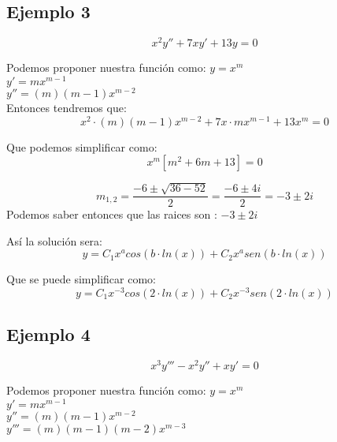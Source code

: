 \documentclass[12pt]{report}                               %
\begin{document}
        \subsection{Ejemplo 3}
        \begin{equation*}
            x^2 y'' + 7 x y' + 13y = 0
        \end{equation*}

        Podemos proponer nuestra función como:
        $y = x^m$\\
        $y' = mx^{m-1}$\\
        $y'' = (m)(m-1)x^{m-2}$\\

        Entonces tendremos que:
        \begin{equation*}
            x^2 \cdot (m)(m-1)x^{m-2} + 7x \cdot mx^{m-1} + 13 x^m= 0
        \end{equation*}

        Que podemos simplificar como:
        \begin{equation*}
            x^m [m^2 + 6m + 13] = 0
        \end{equation*}

        \begin{equation*}
            m_{1,2} = \frac{-6 \pm \sqrt{36-52}}{2} = \frac{-6 \pm 4i}{2} = -3 \pm 2i
        \end{equation*}
        Podemos saber entonces que las raices son : $ -3 \pm 2i$

        Así la solución sera:
        \begin{equation*}
            y = C_1 x^a cos(b \cdot ln(x)) + C_2 x^a sen(b \cdot ln(x))
        \end{equation*}

        Que se puede simplificar como:
        \begin{equation*}
            y = C_1 x^{-3} cos(2 \cdot ln(x)) + C_2 x^{-3} sen(2 \cdot ln(x))
        \end{equation*}

        \subsection{Ejemplo 4}
        \begin{equation*}
            x^3 y''' -x^2y'' + xy' = 0
        \end{equation*}

        Podemos proponer nuestra función como:
        $y = x^m$\\
        $y' = mx^{m-1}$\\
        $y'' = (m)(m-1)x^{m-2}$\\
        $y''' = (m)(m-1)(m-2)x^{m-3}$\\
\end{document}
